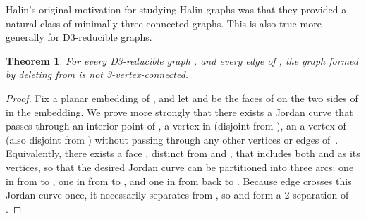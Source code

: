 \documentclass{article}
\newtheorem{theorem}{Theorem}
\begin{document}
Halin's original motivation for studying Halin graphs was that they provided a natural class of minimally three-connected graphs. This is also true more generally for D3-reducible graphs.

\begin{theorem}
For every D3-reducible graph , and every edge  of , the graph  formed by deleting  from  is not 3-vertex-connected.
\end{theorem}

\begin{proof}
Fix a planar embedding of , and let  and  be the faces of  on the two sides of  in the embedding. We prove more strongly that there exists a Jordan curve that passes through an interior point of , a vertex  in  (disjoint from ), an a vertex  of  (also disjoint from ) without passing through any other vertices or edges of~. Equivalently, there exists a face , distinct from  and , that includes both  and  as its vertices, so that the desired Jordan curve can be partitioned into three arcs: one in  from  to , one in  from  to , and one in  from  back to . Because edge  crosses this Jordan curve once, it necessarily separates  from , so  and  form a 2-separation of .


\end{proof}
\end{document}
